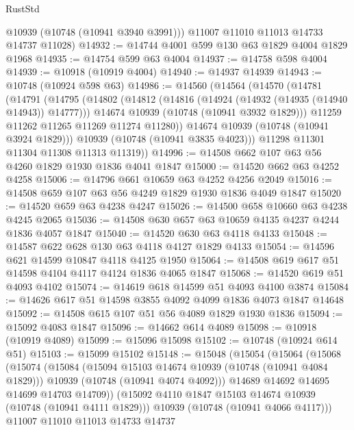 \begin{lexlean}{RustStd}
\begin{coremodule}
{\begin{coremodule}
{{{{{        @10939
        (@10748 (@10941 @3940 @3991)))
      @11007
      @11010
      @11013
      @14733
      @14737
      @11028)
@14932 := @14744 @4001 @599 @130 @63 @1829 @4004 @1829 @1968
@14935 := @14754 @599 @63 @4004
@14937 := @14758 @598 @4004
@14939 := @10918 (@10919 @4004)
@14940 := @14937 @14939
@14943 := @10748 (@10924 @598 @63)
@14986 := @14560
    (@14564
      (@14570
        (@14781
          (@14791
            (@14795
              (@14802
                (@14812
                  (@14816 (@14924 (@14932 (@14935 (@14940 @14943)) @14777)))
                  @14674
                  @10939
                  (@10748 (@10941 @3932 @1829)))
                @11259
                @11262
                @11265
                @11269
                @11274
                @11280))
            @14674
            @10939
            (@10748 (@10941 @3924 @1829)))
          @10939
          (@10748 (@10941 @3835 @4023)))
        @11298
        @11301
        @11304
        @11308
        @11313
        @11319))
@14996 := @14508 @662 @107 @63 @56 @4260 @1829 @1930 @1836 @4041 @1847
@15000 := @14520 @662 @63 @4252 @4258
@15006 := @14796 @661 @10659 @63 @4252 @4256 @2049
@15016 := @14508 @659 @107 @63 @56 @4249 @1829 @1930 @1836 @4049 @1847
@15020 := @14520 @659 @63 @4238 @4247
@15026 := @14500 @658 @10660 @63 @4238 @4245 @2065
@15036 := @14508 @630 @657 @63 @10659 @4135 @4237 @4244 @1836 @4057 @1847
@15040 := @14520 @630 @63 @4118 @4133
@15048 := @14587 @622 @628 @130 @63 @4118 @4127 @1829 @4133
@15054 := @14596 @621 @14599 @10847 @4118 @4125 @1950
@15064 := @14508 @619 @617 @51 @14598 @4104 @4117 @4124 @1836 @4065 @1847
@15068 := @14520 @619 @51 @4093 @4102
@15074 := @14619 @618 @14599 @51 @4093 @4100 @3874
@15084 := @14626 @617 @51 @14598 @3855 @4092 @4099 @1836 @4073 @1847 @14648
@15092 := @14508 @615 @107 @51 @56 @4089 @1829 @1930 @1836
@15094 := @15092 @4083 @1847
@15096 := @14662 @614 @4089
@15098 := @10918 (@10919 @4089)
@15099 := @15096 @15098
@15102 := @10748 (@10924 @614 @51)
@15103 := @15099 @15102
@15148 := @15048
    (@15054
      (@15064
        (@15068
          (@15074
            (@15084
              (@15094 @15103 @14674 @10939 (@10748 (@10941 @4084 @1829)))
              @10939
              (@10748 (@10941 @4074 @4092)))
            @14689
            @14692
            @14695
            @14699
            @14703
            @14709))
        (@15092 @4110 @1847 @15103 @14674 @10939 (@10748 (@10941 @4111 @1829)))
        @10939
        (@10748 (@10941 @4066 @4117)))
      @11007
      @11010
      @11013
      @14733
      @14737
}}}}}
\end{coremodule}}
\end{coremodule}
\end{lexlean}
